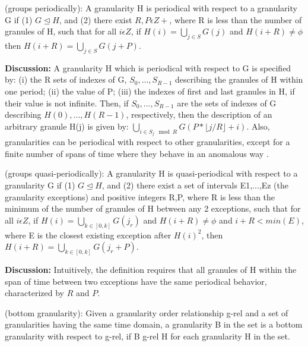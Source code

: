 \documentclass[12pt]{article}
\begin{document}
\begin{definition}\label{def:periodical}
(groups periodically): A granularity H is periodical with respect to a granularity G if
(1) $G \trianglelefteq H$, and
(2) there exist $R,P \epsilon Z+$, where R is less than the number of granules of H, such
that for all $i \epsilon Z$, if $H(i) = \bigcup_{j \in S}G(j)$ and $H (i + R) \neq \phi$ then
$H (i + R) = \bigcup_{j \in S} G(j + P)$.
\end{definition}

\textbf{Discussion:} A granularity H which is periodical with respect to G is specified by:
(i) the R sets of indexes of G, \({S_0,...,S_{R-1}}\) describing the granules of H within one period;
(ii) the value of P;
(iii) the indexes of first and last granules in H, if their value is not infinite.
Then, if \({S_0,...,S_{R-1}}\) are the sets of indexes of G describing
\(H (0), . . . , H (R - 1)\), respectively, then the description of an arbitrary granule H(j) is given by: \(\bigcup_{i \in S_j \mod R}G(P*\lfloor j/R \rfloor + i)\). Also, granularities can be periodical with respect to other granularities, except for a finite number of spans of time where they behave in an anomalous way \citep{Bettini2000-vy}.

\begin{definition}\label{def:quasi}
(groups quasi-periodically): A granularity H is quasi-periodical with respect to a granularity G if
(1) $G \trianglelefteq H$, and
(2) there exist a set of intervals E1,...,Ez (the granularity exceptions) and positive
integers R,P, where R is less than the minimum of the number of granules of H
between any 2 exceptions, such that for all $i \epsilon Z$, if $H(i) = \bigcup_{k \in [0,k]} G(j_r)$  and $H (i + R) \neq \phi$ and $i + R < min(E)$, where E is the closest existing exception after $H (i)^2$, then $H (i + R) = \bigcup_{k \in [0,k]} G(j_r + P )$.
\end{definition}

\textbf{Discussion:} Intuitively, the definition requires that all granules of H within the span of time between two exceptions have the same periodical behavior, characterized by \(R\) and \(P\).

\begin{definition}\label{def:B}
(bottom granularity): Given a granularity order relationship g-rel and a set of granularities having the same time domain, a granularity B in the set is a bottom granularity with respect to g-rel, if B g-rel H for each granularity H in the set. 
\end{definition}
\end{document}
